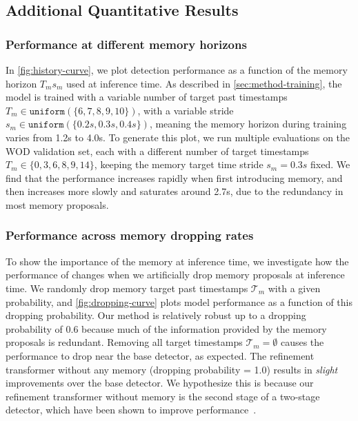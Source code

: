 \subsection{Additional Quantitative Results}
\label{sec:additional-quantitative-results}



\subsubsection{Performance at different memory horizons}
In \cref{fig:history-curve},
we plot detection performance as a
function of the memory horizon $T_m s_m$ used at inference time. 
As described in \cref{sec:method-training}, the model is trained
with a variable number of target past timestamps $T_m \in \texttt{uniform}(\{6, 7, 8, 9, 10\})$,
with a variable stride $s_m \in \texttt{uniform}(\{0.2s, 0.3s, 0.4s\})$, meaning the
memory horizon during training varies from 1.2s to 4.0s.
%
To generate this plot, we run multiple evaluations on the WOD validation set,
each with a different number of target timestamps $T_m \in \{0, 3, 6, 8, 9, 14\}$,
keeping the memory target time stride $s_m = 0.3s$ fixed.
%
We find that the performance increases rapidly
when first introducing memory, and then increases more slowly and saturates
around 2.7s, due to the redundancy in most memory proposals.

\subsubsection{Performance across memory dropping rates}

To show the importance of the memory at inference time,
we investigate how the performance of \ourmodel{} changes
when we artificially drop memory proposals at inference time.
We randomly drop memory target past timestamps $\mathcal{T}_m$ with a given probability,
and \cref{fig:dropping-curve} plots model performance as a function of this dropping probability.
Our method is relatively robust up to a dropping probability of 0.6 because much of the information
provided by the memory proposals is redundant.
Removing all target timestamps $\mathcal{T}_m = \emptyset$ causes the performance to drop near the base detector, as expected.
The refinement transformer without any memory (dropping probability = 1.0) results
in \textit{slight} improvements over the base detector.
We hypothesize this is because our refinement transformer without memory
is the second stage of a two-stage detector,
which have been shown to improve performance~\cite{centerpoint}.

